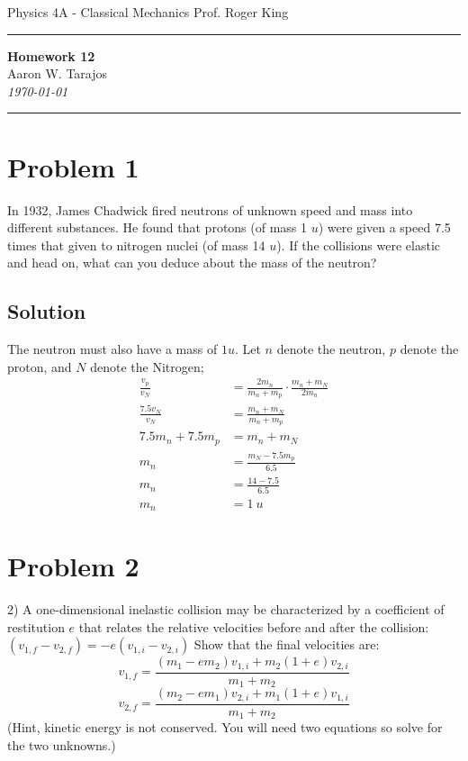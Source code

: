 \documentclass{article}
\begin{document}
\noindent
Physics 4A - Classical Mechanics \hfill Prof. Roger King

\noindent\rule{\textwidth}{0.4pt}

\begin{center}
    \textbf{\LARGE Homework 12} \\
    \vspace{12pt}
    \large Aaron W. Tarajos \\
    \textit{\today}
\end{center}

\noindent\rule{\textwidth}{0.4pt}

\section*{Problem 1}
In 1932, James Chadwick fired neutrons of unknown speed and mass into different
substances. He found that protons (of mass 1 $u$) were given a speed 7.5 times that given to
nitrogen nuclei (of mass 14 $u$). If the collisions were elastic and head on, what can you deduce
about the mass of the neutron?

\subsection*{Solution}
The neutron must also have a mass of $1u$. Let $n$ denote the neutron, $p$ denote the proton, and $N$ denote the Nitrogen;
\begin{align*}
	\frac{v_p}{v_N} &= \frac{2 m_n}{m_n + m_p} \cdot \frac{m_n + m_N}{2m_n} \\
	\frac{7.5 v_N}{v_N} &= \frac{m_n + m_N}{m_n + m_p} \\
	7.5m_n + 7.5m_p &= m_n + m_N \\
	m_n &= \frac{m_N - 7.5m_p}{6.5} \\
	m_n &= \frac{14 - 7.5}{6.5} \\
	m_n &= \boxed{1\ u}
\end{align*}

\section*{Problem 2}
2) A one-dimensional inelastic collision may be characterized by a coefficient of restitution $e$
that relates the relative velocities before and after the collision: $\left(v_{1,f} - v_{2,f}\right) = -e\left(v_{1,i} - v_{2,i} \right)$
Show that the final velocities are:
\[
	v_{1,f} = \frac{(m_1 - e m_2)v_{1,i} + m_2 (1+e)v_{2,i}}{m_1 + m_2}
\]
\[
	v_{2,f} = \frac{(m_2 - e m_1)v_{2,i} + m_1 (1+e)v_{1,i}}{m_1 + m_2}
\]
(Hint, kinetic energy is not conserved. You will need two equations so solve for the two
unknowns.)
\end{document}
